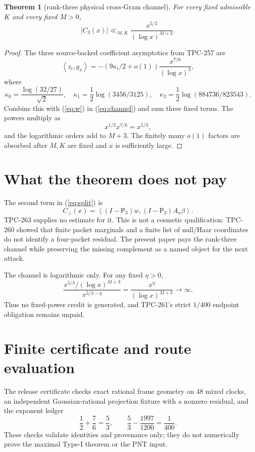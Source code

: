 \documentclass[11pt]{article}
\newtheorem{theorem}{Theorem}
\newcommand{\ip}[2]{\left\langle #1,#2\right\rangle}
\newcommand{\PP}{\mathsf P_3}
\begin{document}
\begin{theorem}[rank-three physical cross-Gram channel]
For every fixed admissible \(K\) and every fixed \(M>0\),
\[
 |C_3(x)|\ll_{M,K}\frac{x^{5/3}}{(\log x)^{M+3}}.
\]
\end{theorem}
\begin{proof}
The three source-backed coefficient asymptotics from TPC-257 are
\[
 \ip{z_i}{g_x}=-(9\kappa_i/2+o(1))
       \frac{x^{7/6}}{(\log x)^3},
\]
where
\[
 \kappa_0=\frac{\log(32/27)}{\sqrt2},\quad
 \kappa_1=\frac12\log(3456/3125),\quad
 \kappa_2=\frac12\log(884736/823543).
\]
Combine this with (\ref{eq:w}) in (\ref{eq:channel}) and sum three fixed
terms.  The powers multiply as
\[
 x^{1/2}x^{7/6}=x^{5/3},
\]
and the logarithmic orders add to \(M+3\).  The finitely many \(o(1)\) factors
are absorbed after \(M,K\) are fixed and \(x\) is sufficiently large.
\end{proof}

\section{What the theorem does not pay}
The second term in (\ref{eq:split}) is
\[
 C_\perp(x)=\ip{(I-\PP)w}{(I-\PP)A_x\beta}.
\]
TPC-263 supplies no estimate for it.  This is not a cosmetic qualification:
TPC-260 showed that finite packet marginals and a finite list of null/Haar
coordinates do not identify a four-packet residual.  The present paper pays
the rank-three channel while preserving the missing complement as a named
object for the next attack.

The channel is logarithmic only.  For any fixed \(\eta>0\),
\[
 \frac{x^{5/3}/(\log x)^{M+3}}{x^{5/3-\eta}}
 =\frac{x^\eta}{(\log x)^{M+3}}\longrightarrow\infty.
\]
Thus no fixed-power credit is generated, and TPC-261's strict \(1/400\)
endpoint obligation remains unpaid.

\section{Finite certificate and route evaluation}
The release certificate checks exact rational frame geometry on 48 mixed clocks,
an independent Gaussian-rational projection fixture with a nonzero residual,
and the exponent ledger
\[
 \frac12+\frac76=\frac53,\qquad
 \frac53-\frac{1997}{1200}=\frac1{400}.
\]
These checks validate identities and provenance only; they do not numerically
prove the maximal Type-I theorem or the PNT input.
\end{document}
